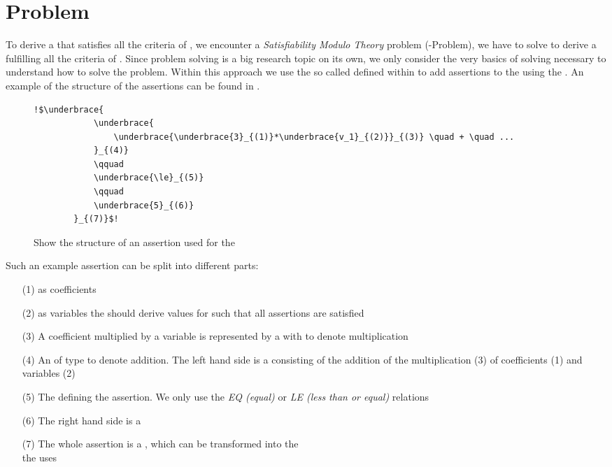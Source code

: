 \section{ Problem}
\label{sec:smt-problem}
To derive a \gna that satisfies all the criteria of , we encounter a \textit{Satisfiability Modulo Theory} problem (-Problem), we have to solve to derive a \gna fulfilling all the criteria of . Since  problem solving is a big research topic on its own, we only consider the very basics of  solving necessary to understand how to solve the problem. \newline
Within this approach we use the so called  defined within \aprove to add assertions to the \solver using the \smtfactory. An example of the structure of the assertions can be found in . %

\begin{figure}[H]
	\begin{lstlisting}[escapechar = !]
		!$\underbrace{
			\underbrace{
				\underbrace{\underbrace{3}_{(1)}*\underbrace{v_1}_{(2)}}_{(3)} \quad + \quad ...
			}_{(4)} 
			\qquad
			\underbrace{\le}_{(5)}
			\qquad
			\underbrace{5}_{(6)}
		}_{(7)}$!
	\end{lstlisting}
	\caption{Show the structure of an assertion used for the \solver}
	\label{ex:assertion-structure}
\end{figure}

Such an example assertion can be split into different parts: 
\begin{enumerate}
	\item[(1)]  as coefficients
	\item[(2)]  as variables the \solver should derive values for such that all assertions are satisfied
	\item[(3)] A coefficient multiplied by a variable is represented by a  with   to denote multiplication
	\item[(4)] An  of type  to denote addition. The left hand side is a  consisting of the addition of the multiplication (3) of coefficients (1) and variables (2)
	\item[(5)] The  defining the assertion. We only use the \textit{EQ (equal)} or \textit{LE (less than or equal)} relations
	\item[(6)] The right hand side is a 
	\item[(7)] The whole assertion is a , which can be transformed into the \\  the \solver uses
\end{enumerate}

